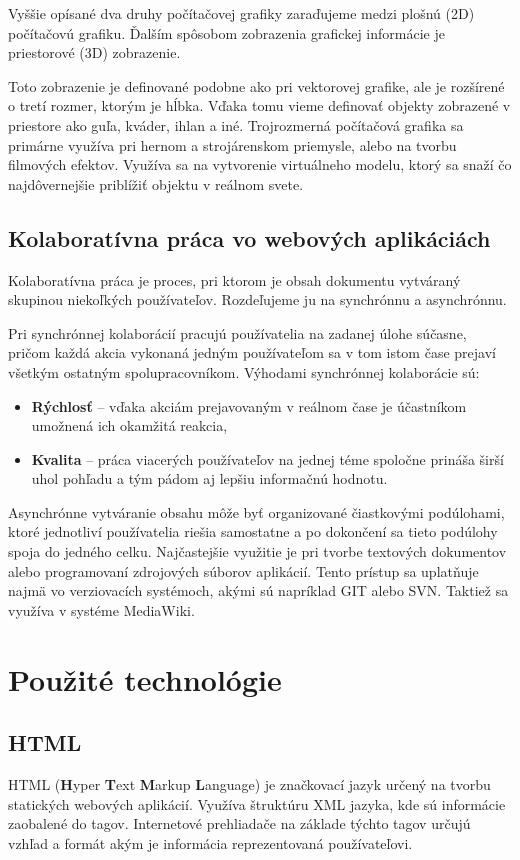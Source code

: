 Vyššie opísané dva druhy počítačovej grafiky zaraďujeme medzi plošnú (2D) počítačovú grafiku. Ďalším spôsobom zobrazenia grafickej informácie je priestorové (3D) zobrazenie. 

Toto zobrazenie je definované podobne ako pri vektorovej grafike, ale je rozšírené o tretí rozmer, ktorým je hĺbka. Vďaka tomu vieme definovať objekty zobrazené v priestore ako guľa, kváder, ihlan a iné. Trojrozmerná počítačová grafika sa primárne využíva pri hernom a strojárenskom priemysle, alebo na tvorbu filmových efektov. Využíva sa na vytvorenie virtuálneho modelu, ktorý sa snaží čo najdôvernejšie priblížiť objektu v reálnom svete. 


\subsection{Kolaboratívna práca vo webových aplikáciách}

Kolaboratívna práca \cite{doi:10.1177/0021943603259363} je proces, pri ktorom je obsah dokumentu vytváraný skupinou niekoľkých používateľov. Rozdeľujeme ju na synchrónnu a asynchrónnu.

Pri synchrónnej kolaborácií pracujú používatelia na zadanej úlohe súčasne, pričom každá akcia vykonaná jedným používateľom sa v tom istom čase prejaví všetkým ostatným spolupracovníkom. Výhodami synchrónnej kolaborácie sú:
\begin{itemize}
	\item \textbf{Rýchlosť} -- vďaka akciám prejavovaným v reálnom čase je účastníkom umožnená ich okamžitá reakcia,
	\item \textbf{Kvalita} -- práca viacerých používateľov na jednej téme spoločne prináša širší uhol pohľadu a tým pádom aj lepšiu informačnú hodnotu.
\end{itemize}

Asynchrónne vytváranie obsahu môže byť organizované čiastkovými podúlohami, ktoré jednotliví používatelia riešia samostatne a po dokončení sa tieto podúlohy spoja do jedného celku. Najčastejšie využitie je pri tvorbe textových dokumentov alebo programovaní zdrojových súborov aplikácií. Tento prístup sa uplatňuje najmä vo verziovacích systémoch, akými sú napríklad GIT alebo SVN. Taktiež sa využíva v systéme MediaWiki.
\section{Použité technológie}

\subsection{HTML}
HTML (\textbf{H}yper \textbf{T}ext \textbf{M}arkup \textbf{L}anguage) je značkovací jazyk určený na tvorbu statických webových aplikácií. Využíva štruktúru XML jazyka, kde sú informácie zaobalené do tagov. Internetové prehliadače na základe týchto tagov určujú vzhľad a formát akým je informácia reprezentovaná používateľovi. 

